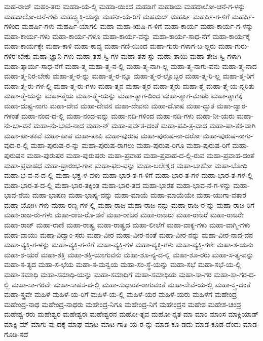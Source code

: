 {ಮಹ-ರಾಜ್
ಮಹಂ-ತರು
ಮಹಡಿ-ಯ-ಲ್ಲಿ
ಮಹಡಿ-ಯಿಂದ
ಮಹಡಿಗೆ
ಮಹಡಿಯ
ಮಹದಾಲೋ-ಚನೆ-ಗ-ಳನ್ನು
ಮಹದಾಲೋ-ಚನೆ-ಗಳು
ಮಹದ್ವ್ಯಕ್ತಿ-ಯನ್ನು
ಮಹನೀ-ಯ-ರಿಗೆ
ಮಹಮದ್
ಮಹರ್ಷಿ
ಮಹರ್ಷಿ-ಗ-ಳಿಗೆ
ಮಹರ್ಷಿ-ಗಳಿಂದ
ಮಹರ್ಷಿ-ಗಳು
ಮಹರ್ಷಿ-ಯಾಗಲಿ
ಮಹಾ
ಮಹಾ-ಋಷಿ-ಗ-ಳಿಗೆ
ಮಹಾ-ಕಾರ್ಯ
ಮಹಾ-ಕಾರ್ಯ-ಗ-ಳನ್ನು
ಮಹಾ-ಕಾರ್ಯ-ಗಳು
ಮಹಾ-ಕಾರ್ಯ-ಗಳೂ
ಮಹಾ-ಕಾರ್ಯ-ವನ್ನು
ಮಹಾ-ಕಾರ್ಯ-ಸಾಧ-ನೆಗೆ
ಮಹಾ-ಕಾರ್ಯಕ್ಕೆ
ಮಹಾ-ಕಾರ್ಯಕ್ಕೇ
ಮಹಾ-ಕಾಳಿ
ಮಹಾ-ಕಾವ್ಯ
ಮಹಾ-ಗಣಿ-ಯಿಂದ
ಮಹಾ-ಗುರು-ಗಳಾಗ-ಬ-ಲ್ಲರು
ಮಹಾ-ಗುರು-ಗಳಿರ-ಬೇಕು
ಮಹಾ-ಜ್ಞಾನಿ-ಗಳು
ಮಹಾ-ತಪ-ಸ್ವಿ-ಗಳ
ಮಹಾ-ತಪ-ಸ್ಸು
ಮಹಾ-ತಾಯಿ
ಮಹಾ-ತೇಜ-ಸ್ವಿ-ಗಳಾಗಿ
ಮಹಾ-ತ್ಕಾರ್ಯ-ಸಾಧ-ನೆಗೆ
ಮಹಾ-ತ್ಮ
ಮಹಾ-ತ್ಮ-ನ-ಲ್ಲಿ
ಮಹಾ-ತ್ಮ-ನಾಗಿ-ಲ್ಲ
ಮಹಾ-ತ್ಮ-ನಾಗು-ವನು
ಮಹಾ-ತ್ಮ-ನಾದ
ಮಹಾ-ತ್ಮ-ನಿರ-ಬೇಕು
ಮಹಾ-ತ್ಮ-ರ-ನ್ನು
ಮಹಾ-ತ್ಮ-ರ-ನ್ನೂ
ಮಹಾ-ತ್ಮ-ರ-ಲ್ಲೊಬ್ಬರ
ಮಹಾ-ತ್ಮ-ರಿ-ಲ್ಲ
ಮಹಾ-ತ್ಮ-ರಿಗೆ
ಮಹಾ-ತ್ಮ-ರು-ಗಳ-ಲ್ಲಿ
ಮಹಾ-ತ್ಮ-ರು-ಗಳು
ಮಹಾ-ತ್ಮನ
ಮಹಾ-ತ್ಮರ
ಮಹಾ-ತ್ಮರು
ಮಹಾ-ತ್ಮೆ
ಮಹಾ-ತ್ಮೆ-ಯ-ನ್ನರಿತು
ಮಹಾ-ತ್ಮೆ-ಯನ್ನು
ಮಹಾ-ತ್ಮೆಯ
ಮಹಾ-ತ್ಮ್ಯೆ-ಯನ್ನು
ಮಹಾ-ತ್ಯಾಗ-ದಿಂದ
ಮಹಾ-ತ್ಯಾಗ-ಮಾಡು
ಮಹಾ-ತ್ಯಾಗಕ್ಕೆ
ಮಹಾ-ದುಷ್ಟ-ನಾಗು
ಮಹಾ-ದೇವ
ಮಹಾ-ದೇವನ
ಮಹಾ-ದೇವನು
ಮಹಾ-ದೋಷ
ಮಹಾ-ದ್ಭುತ
ಮಹಾ-ದ್ವಾರ-ಗಳಂತೆ
ಮಹಾ-ನಂದ-ದ-ಲ್ಲಿ
ಮಹಾ-ನಂದ-ವನ್ನು
ಮಹಾ-ನದಿ-ಗಳಿಂದ
ಮಹಾ-ನದಿ-ಗಳು
ಮಹಾ-ನೀ-ಯರು
ಮಹಾ-ನು-ಭಾ-ವನೆ
ಮಹಾ-ನು-ಭಾವ-ನಾದ
ಮಹಾ-ನ್
ಮಹಾ-ಪರ್ವತ-ದಂತೆ
ಮಹಾ-ಪವಿ-ತ್ರ-ವಾದ
ಮಹಾ-ಪಾ-ತಕ-ವಾಗಿ
ಮಹಾ-ಪಾ-ತಕವೆ
ಮಹಾ-ಪಾಪ
ಮಹಾ-ಪಾಪಿ
ಮಹಾ-ಪುರುಷ
ಮಹಾ-ಪುರುಷ-ನಾ-ದರೋ
ಮಹಾ-ಪುರುಷ-ನಾಗು-ವುದ-ರ-ಲ್ಲಿ
ಮಹಾ-ಪುರುಷ-ರ-ನ್ನು
ಮಹಾ-ಪುರುಷ-ರಾಗಲು
ಮಹಾ-ಪುರುಷ-ರಿಗೂ
ಮಹಾ-ಪುರುಷ-ರಿಗೆ
ಮಹಾ-ಪುರುಷನ
ಮಹಾ-ಪುರುಷರ
ಮಹಾ-ಪುರುಷರು
ಮಹಾ-ಪ್ರವಾಹ
ಮಹಾ-ಪ್ರವಾಹ-ದ-ಲ್ಲಿ-ರುವ
ಮಹಾ-ಪ್ರವಾಹ-ದಂತೆ
ಮಹಾ-ಪ್ರವಾಹದ
ಮಹಾ-ಪ್ರಾರಂಭ-ಗಾನ
ಮಹಾ-ಫಲ-ವನ್ನು
ಮಹಾ-ಬಲೇಶ್ವರ
ಮಹಾ-ಬಾಹೋ
ಮಹಾ-ಬೋಧಿ
ಮಹಾ-ಭ-ವ-ನ-ದ-ಲ್ಲಿ
ಮಹಾ-ಭಕ್ತ-ಳ-ವಳು
ಮಹಾ-ಭಾರ-ತ-ಗ-ಳಿಗೆ
ಮಹಾ-ಭಾರ-ತ-ಗಳ
ಮಹಾ-ಭಾರ-ತ-ಗಳ-ಲ್ಲಿ
ಮಹಾ-ಭಾರ-ತ-ದ-ಲ್ಲಿ
ಮಹಾ-ಭಾರ-ತಕ್ಕಿಂತ
ಮಹಾ-ಭಾರ-ತದ
ಮಹಾ-ಭಾರತ
ಮಹಾ-ಭಾವ-ನೆ-ಗ-ಳನ್ನು
ಮಹಾ-ಭಾವ-ನೆಯ
ಮಹಾ-ಭಾಷಣ
ಮಹಾ-ಭಾಷ್ಯ-ವನ್ನು
ಮಹಾ-ಮಾಯೆ
ಮಹಾ-ಮಾಯೆಯೇ
ಮಹಾ-ಯುಗಾ-ವತಾರ
ಮಹಾ-ಯೋಗಿ-ಗಳು
ಮಹಾ-ರಣ್ಯ-ಗಳ-ಲ್ಲಿ
ಮಹಾ-ರಾಜ
ಮಹಾ-ರಾಜ-ನನ್ನು
ಮಹಾ-ರಾಜ-ರ-ನ್ನು
ಮಹಾ-ರಾಜ-ರಿಗೆ
ಮಹಾ-ರಾಜ-ರು-ಗಳು
ಮಹಾ-ರಾಜ-ರೊ-ಡನೆ
ಮಹಾ-ರಾಜರ
ಮಹಾ-ರಾಜರು
ಮಹಾ-ರಾಜರೆ
ಮಹಾ-ರಾಜರೇ
ಮಹಾ-ರಾಜ್
ಮಹಾ-ರಾಣಿ
ಮಹಾ-ರಾಷ್ಟ್ರ
ಮಹಾ-ರಾಷ್ಟ್ರದ
ಮಹಾ-ಲೀಲೆಗೆ
ಮಹಾ-ವಾಕ್ಯ-ಗಳು
ಮಹಾ-ವಾಗ್ಮಿ-ಗಳು
ಮಹಾ-ವಾಯು
ಮಹಾ-ವಿದ್ವಾಂ-ಸರು
ಮಹಾ-ವೀರ
ಮಹಾ-ವೀರ-ನಂತೆ
ಮಹಾ-ವೀರ-ನನ್ನು
ಮಹಾ-ವೀರ-ನಾದ-ವನ
ಮಹಾ-ವ್ಯಕ್ತಿ-ಗ-ಳನ್ನು
ಮಹಾ-ವ್ಯಕ್ತಿ-ಗ-ಳಿಗೆ
ಮಹಾ-ವ್ಯಕ್ತಿ-ಗಳ
ಮಹಾ-ವ್ಯಕ್ತಿ-ಗಳು
ಮಹಾ-ವ್ಯಕ್ತಿ-ಗಳೇ
ಮಹಾ-ಶ-ಯನು
ಮಹಾ-ಶ-ಯರೆ
ಮಹಾ-ಶಕ್ತಿ
ಮಹಾ-ಶಕ್ತಿ-ಯಾಗುವನು
ಮಹಾ-ಶೂ-ನ್ಯ-ದ-ಲ್ಲಿ
ಮಹಾ-ಶೂ-ರರು
ಮಹಾ-ಸ-ತ್ಯ-ವನ್ನು
ಮಹಾ-ಸ-ತ್ಯದ
ಮಹಾ-ಸ-ಭೆಯ
ಮಹಾ-ಸ-ಮನ್ವಯ
ಮಹಾ-ಸಂ-ಸ್ಥೆ-ಯನ್ನು
ಮಹಾ-ಸಭೆ
ಮಹಾ-ಸಭೆ-ಯ-ಲ್ಲಿ
ಮಹಾ-ಸಮಾಧಿ
ಮಹಾ-ಸಮಾಧಿ-ಯನ್ನು
ಮಹಾ-ಸಮಾಧಿಗೆ
ಮಹಾ-ಸಮಾಧಿಯ
ಮಹಾ-ಸಾ-ಗರ
ಮಹಾ-ಸಾ-ಗರ-ದ-ಲ್ಲಿ
ಮಹಾ-ಸಾ-ಗರವೇ
ಮಹಾ-ಸಾಹಸ-ದ-ಲ್ಲಿ
ಮಹಾ-ಸುಧಾರಕ-ರಾಗುವಂತೆ
ಮಹಾ-ಸೇವೆ-ಯ-ಲ್ಲಿ
ಮಹಾ-ಸ್ತ್ರ-ದಂತೆ
ಮಹಾ-ಸ್ತ್ರವೇ
ಮಹಿಳೆ
ಮಹಿಳೆ-ಯ-ರಿಗೆ
ಮಹಿಳೆ-ಯ-ಲ್ಲಿ
ಮಹಿಳೆ-ಯರ
ಮಹಿಳೆ-ಯರು
ಮಹಿಳೆಗೆ
ಮಹೇಂದ್ರ
ಮಹೇಂದ್ರ-ನಾಥ
ಮಹೇಂದ್ರ-ನಾಥರು
ಮಹೇಂದ್ರ-ನಿಗೂ
ಮಹೇಂದ್ರ-ನಿಗೆ
ಮಹೇಂದ್ರನ
ಮಹೇಶ
ಮಹೇಶ-ಚಂದ್ರ
ಮಹೇಶ್ವ-ರರು
ಮಹೇಶ್ವರ
ಮಹೇಶ್ವರಃ
ಮಹೇಶ್ವರನ
ಮಹೋ-ತ್ಸವ
ಮಹೋ-ನ್ನತ
ಮಾ
ಮಾಂ
ಮಾಂಸ
ಮಾಕ್ಲಿಯಾಡ್
ಮಾಕ್ಸಿ-ಮ್
ಮಾಗು-ವು-ದಕ್ಕೆ
ಮಾಘ
ಮಾಟ
ಮಾಟ-ಗಾತಿ-ಯ-ರ-ನ್ನು
ಮಾಡ-ಕೂ-ಡದು
ಮಾಡ-ಕೂಡ-ದೆಂದು
ಮಾಡ-ಗೊಡಿ-ಸದೆ
}
